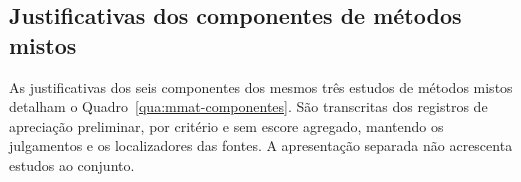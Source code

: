 \begin{apendicesenv}
\section{Justificativas dos componentes de métodos mistos}

As justificativas dos seis componentes dos mesmos três estudos de métodos mistos detalham o Quadro~\ref{qua:mmat-componentes}. São transcritas dos registros de apreciação preliminar, por critério e sem escore agregado, mantendo os julgamentos e os localizadores das fontes. A apresentação separada não acrescenta estudos ao conjunto.





\end{apendicesenv}
